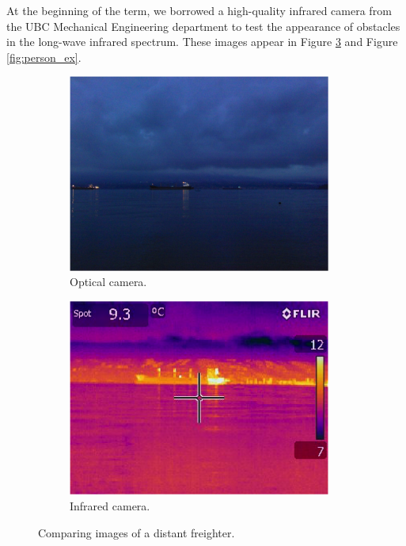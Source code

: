 At the beginning of the term, we borrowed a high-quality infrared camera from the UBC Mechanical Engineering department to test the appearance of obstacles in the long-wave infrared spectrum. These images appear in Figure \ref{fig:freighter_ex} and Figure \ref{fig:person_ex}.

\begin{figure}
\centering
\begin{subfigure}{0.45\textwidth}
 \centering
 \includegraphics[width=0.95\textwidth]{"./image/freighter_normal"}
 \caption{Optical camera.}
 \label{fig:freighter_ex:sub1}
\end{subfigure}
\begin{subfigure}{0.45\textwidth}
 \centering
 \includegraphics[width=0.95\textwidth]{"./image/freighter_ir"}
 \caption{Infrared camera.}
 \label{fig:freighter_ex:sub2}
\end{subfigure}
\caption{Comparing images of a distant freighter.}
\label{fig:freighter_ex}
\end{figure}

